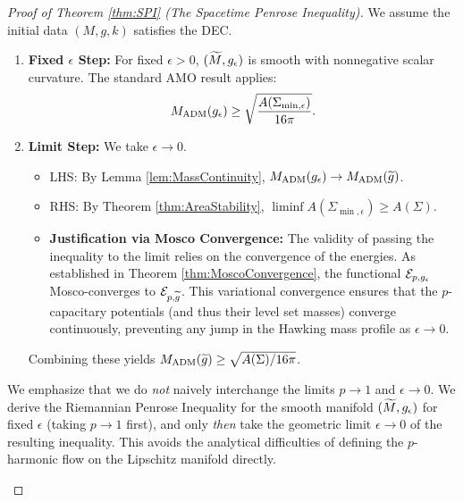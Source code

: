 \begin{proof}[Proof of Theorem \ref{thm:SPI} (The Spacetime Penrose Inequality)]
We assume the initial data $(M,g,k)$ satisfies the DEC.

\begin{enumerate}
\item \textbf{Fixed $\epsilon$ Step:} For fixed $\epsilon > 0$, $(\widetilde{M}, g_{\epsilon})$ is smooth with nonnegative scalar curvature. The standard AMO result applies:
   \[ M_{\mathrm{ADM}}(g_{\epsilon}) \ge \sqrt{\frac{A(\Sigma_{\min, \epsilon})}{16\pi}}. \]
\item \textbf{Limit Step:} We take $\epsilon \to 0$.
   \begin{itemize}
       \item LHS: By Lemma \ref{lem:MassContinuity}, $M_{\mathrm{ADM}}(g_{\epsilon}) \to M_{\mathrm{ADM}}(\widetilde{g})$.
    \item RHS: By Theorem \ref{thm:AreaStability}, $\liminf A(\Sigma_{\min, \epsilon}) \ge A(\Sigma)$.
       \item \textbf{Justification via Mosco Convergence:} The validity of passing the inequality to the limit relies on the convergence of the energies. As established in Theorem \ref{thm:MoscoConvergence}, the functional $\mathcal{E}_{p,g_{\epsilon}}$ Mosco-converges to $\mathcal{E}_{p,\widetilde{g}}$. This variational convergence ensures that the $p$-capacitary potentials (and thus their level set masses) converge continuously, preventing any jump in the Hawking mass profile as $\epsilon \to 0$.
   \end{itemize}
   Combining these yields $M_{\mathrm{ADM}}(\widetilde{g}) \ge \sqrt{A(\Sigma)/16\pi}$.
\end{enumerate}

\begin{remark}
We emphasize that we do \emph{not} naively interchange the limits $p \to 1$ and $\epsilon \to 0$. We derive the Riemannian Penrose Inequality for the smooth manifold $(\widetilde{M}, g_{\epsilon})$ for fixed $\epsilon$ (taking $p \to 1$ first), and only \emph{then} take the geometric limit $\epsilon \to 0$ of the resulting inequality. This avoids the analytical difficulties of defining the $p$-harmonic flow on the Lipschitz manifold directly.


\end{remark}
\end{proof}
